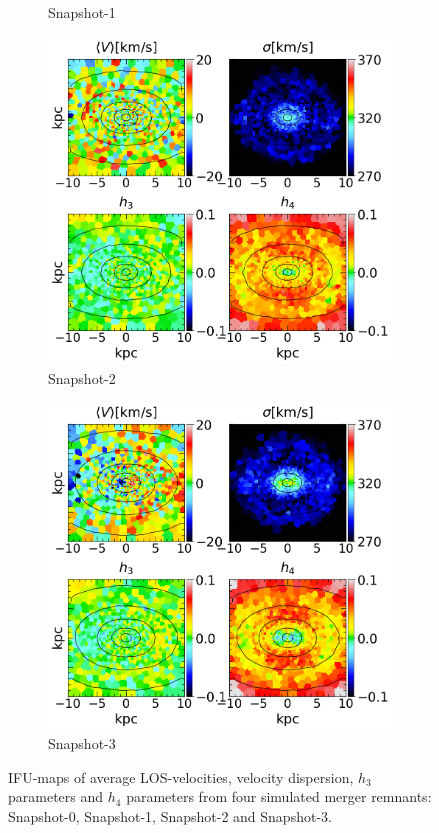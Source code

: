 \documentclass[english, oneside]{HYgradu}
\begin{document}
\begin{figure}
\begin{subfigure}[b]{0.49\textwidth}
		\caption{Snapshot-1}
	\end{subfigure}
	\begin{subfigure}[b]{0.49\textwidth}
		\includegraphics[width=\textwidth]{BH_2.png}
		\caption{Snapshot-2}
	\end{subfigure}
	\begin{subfigure}[b]{0.49\textwidth}
		\includegraphics[width=\textwidth]{BH_3.png}
		\caption{Snapshot-3}
	\end{subfigure}
	\caption{IFU-maps of average LOS-velocities, velocity dispersion, $h_3$ parameters and $h_4$ parameters from four simulated merger remnants: Snapshot-0, Snapshot-1, Snapshot-2 and Snapshot-3.}
	\label{figure:all_voronoi_1}
\end{figure}
\end{document}
